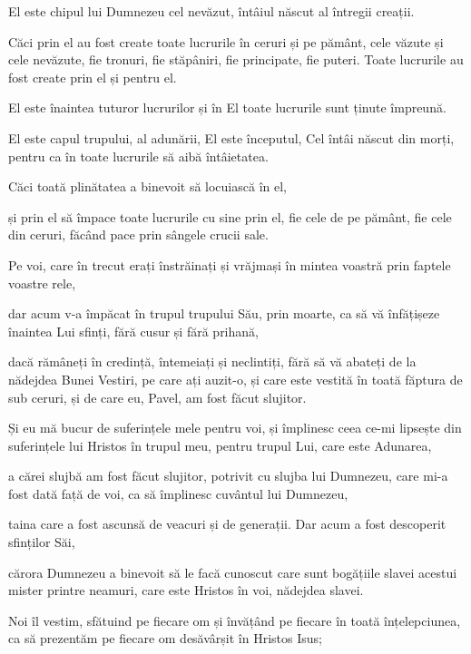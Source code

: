 {\par }{\PP {}El este chipul lui Dumnezeu cel nevăzut, întâiul născut al întregii creații.

Căci prin el au fost create toate lucrurile în ceruri și pe pământ, cele văzute și cele nevăzute, fie tronuri, fie stăpâniri, fie principate, fie puteri. Toate lucrurile au fost create prin el și pentru el.

El este înaintea tuturor lucrurilor și în El toate lucrurile sunt ținute împreună.

El este capul trupului, al adunării, El este începutul, Cel întâi născut din morți, pentru ca în toate lucrurile să aibă întâietatea.

Căci toată plinătatea a binevoit să locuiască în el,

și prin el să împace toate lucrurile cu sine prin el, fie cele de pe pământ, fie cele din ceruri, făcând pace prin sângele crucii sale.


\par }{\PP {}Pe voi, care în trecut erați înstrăinați și vrăjmași în mintea voastră prin faptele voastre rele,

dar acum v-a împăcat în trupul trupului Său, prin moarte, ca să vă înfățișeze înaintea Lui sfinți, fără cusur și fără prihană,

dacă rămâneți în credință, întemeiați și neclintiți, fără să vă abateți de la nădejdea Bunei Vestiri, pe care ați auzit-o, și care este vestită în toată făptura de sub ceruri, și de care eu, Pavel, am fost făcut slujitor.


\par }{\PP {}Și eu mă bucur de suferințele mele pentru voi, și împlinesc ceea ce-mi lipsește din suferințele lui Hristos în trupul meu, pentru trupul Lui, care este Adunarea,

a cărei slujbă am fost făcut slujitor, potrivit cu slujba lui Dumnezeu, care mi-a fost dată față de voi, ca să împlinesc cuvântul lui Dumnezeu,

taina care a fost ascunsă de veacuri și de generații. Dar acum a fost descoperit sfinților Săi,

cărora Dumnezeu a binevoit să le facă cunoscut care sunt bogățiile slavei acestui mister printre neamuri, care este Hristos în voi, nădejdea slavei.

Noi îl vestim, sfătuind pe fiecare om și învățând pe fiecare în toată înțelepciunea, ca să prezentăm pe fiecare om desăvârșit în Hristos Isus;

}
